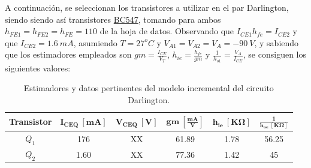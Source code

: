 %
%
%

A continuación, se seleccionan los transistores a utilizar en el par Darlington, siendo siendo así transistores \href{https://www.sparkfun.com/datasheets/Components/BC546.pdf}{BC547}, tomando para ambos $h_{FE1} = h_{FE2} = h_{FE} = 110$ de la hoja de datos. Observando que $I_{CE1} h_{fe} = I_{CE2}$ y que $I_{CE2} = 1.6 \ mA$, asumiendo $T = 27^o C$ y $V_{A1} = V_{A2} = V_A = -90 \ V$, y sabiendo que los estimadores empleados son $gm = \frac{I_{CE}}{V_T}$, $h_{ie} = \frac{h_{fe}}{gm}$ y $\frac{1}{h_{o1}} = \frac{V_A}{I_{CE}}$, se consiguen los siguientes valores:
\begin{table}[H]
\centering
\begin{tabular}{cccccc}
\hline
\textbf{Transistor} & $\mathbf{I_{CEQ} \ [mA]}$ & $\mathbf{V_{CEQ} \ [V]}$ & $\mathbf{gm \ \left[ \frac{mA}{V} \right]}$ & $\mathbf{h_{ie} \ \left[ K\Omega \right]}$ & $\mathbf{\frac{1}{h_{oe} \ \left[ K\Omega \right]}}$ \\
\hline
$Q_1$ & 176 & XX & 61.89 & 1.78 & 56.25 \\
$Q_2$ & 1.60 & XX & 77.36 & 1.42 & 45	\\
\hline
\end{tabular}
\caption{Estimadores y datos pertinentes del modelo incremental del circuito Darlington.}
\label{tab:estim}
\end{table}


